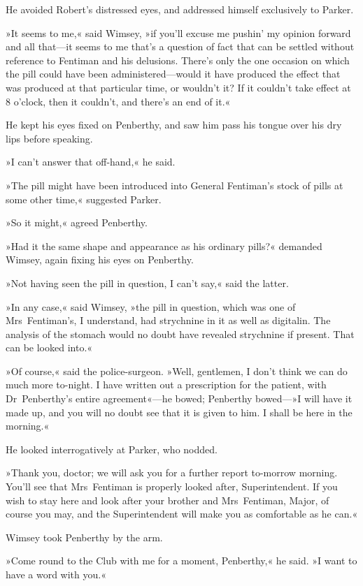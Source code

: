 He avoided Robert's distressed eyes, and addressed himself exclusively to Parker.

»It seems to me,« said Wimsey, »if you'll excuse me pushin' my opinion forward and all that—it seems to me that's a question of fact that can be settled without reference to Fentiman and his delusions. There's only the one occasion on which the pill could have been administered—would it have produced the effect that was produced at that particular time, or wouldn't it? If it couldn't take effect at 8 o'clock, then it couldn't, and there's an end of it.«

He kept his eyes fixed on Penberthy, and saw him pass his tongue over his dry lips before speaking.

»I can't answer that off-hand,« he said.

»The pill might have been introduced into General Fentiman's stock of pills at some other time,« suggested Parker.

»So it might,« agreed Penberthy.

»Had it the same shape and appearance as his ordinary pills?« demanded Wimsey, again fixing his eyes on Penberthy.

»Not having seen the pill in question, I can't say,« said the latter.

»In any case,« said Wimsey, »the pill in question, which was one of Mrs~Fentiman's, I understand, had strychnine in it as well as digitalin. The analysis of the stomach would no doubt have revealed strychnine if present. That can be looked into.«

»Of course,« said the police-surgeon. »Well, gentlemen, I don't think we can do much more to-night. I have written out a prescription for the patient, with Dr~Penberthy's entire agreement«—he bowed; Penberthy bowed—»I will have it made up, and you will no doubt see that it is given to him. I shall be here in the morning.«

He looked interrogatively at Parker, who nodded.

»Thank you, doctor; we will ask you for a further report to-morrow morning. You'll see that Mrs~Fentiman is properly looked after, Superintendent. If you wish to stay here and look after your brother and Mrs~Fentiman, Major, of course you may, and the Superintendent will make you as comfortable as he can.«

Wimsey took Penberthy by the arm.

»Come round to the Club with me for a moment, Penberthy,« he said. »I want to have a word with you.«